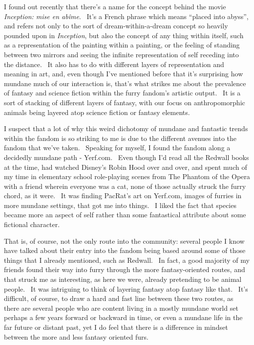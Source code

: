 I found out recently that there's a name for the concept behind the
movie \emph{Inception: mise en abîme}. ~It's a French phrase which means
``placed into abyss'', and refers not only to the sort of
dream-within-a-dream concept so heavily pounded upon in
\emph{Inception}, but also the concept of any thing within itself, such
as a representation of the painting within a painting, or the feeling of
standing between two mirrors and seeing the infinite representation of
self receding into the distance. ~It also has to do with different
layers of representation and meaning in art, and, even though I've
mentioned before that it's surprising how mundane much of our
interaction is, that's what strikes me about the prevalence of fantasy
and science fiction within the furry fandom's artistic output. ~It is a
sort of stacking of different layers of fantasy, with our focus on
anthropomorphic animals being layered atop science fiction or fantasy
elements.

I suspect that a lot of why this weird dichotomy of mundane and
fantastic trends within the fandom is so striking to me is due to the
different avenues into the fandom that we've taken. ~Speaking for
myself, I found the fandom along a decidedly mundane path - Yerf.com.
~Even though I'd read all the Redwall books at the time, had watched
Disney's Robin Hood over and over, and spent much of my time in
elementary school role-playing scenes from The Phantom of the Opera with
a friend wherein everyone was a cat, none of those actually struck the
furry chord, as it were. ~It was finding PacRat's art on Yerf.com,
images of furries in more mundane settings, that got me into things. ~I
liked the fact that species became more an aspect of self rather than
some fantastical attribute about some fictional character.

That is, of course, not the only route into the community: several
people I know have talked about their entry into the fandom being based
around some of those things that I already mentioned, such as Redwall.
~In fact, a good majority of my friends found their way into furry
through the more fantasy-oriented routes, and that struck me as
interesting, as here we were, already pretending to be animal people.
~It was intriguing to think of layering fantasy atop fantasy like that.
~It's difficult, of course, to draw a hard and fast line between these
two routes, as there are several people who are content living in a
mostly mundane world set perhaps a few years forward or backward in
time, or even a mundane life in the far future or distant past, yet I do
feel that there is a difference in mindset between the more and less
fantasy oriented furs.

